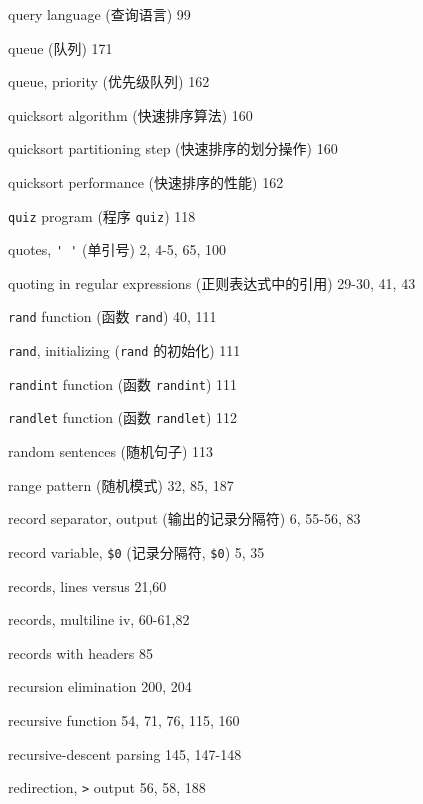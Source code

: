 \begin{multicols}{3}
\hangindent=3pc  query language (查询语言) 99

\hangindent=3pc  queue (队列) 171

\hangindent=3pc  queue, priority (优先级队列) 162

\hangindent=3pc  quicksort algorithm (快速排序算法) 160

\hangindent=3pc  quicksort partitioning step
(快速排序的划分操作) 160

\hangindent=3pc  quicksort performance (快速排序的性能) 162

\hangindent=3pc  \verb'quiz' program (程序 \verb'quiz') 118

\hangindent=3pc  quotes, \verb"' '" (单引号) 2, 4-5, 65, 100

\hangindent=3pc  quoting in regular expressions
(正则表达式中的引用) 29-30, 41, 43

\hangindent=3pc  \verb'rand' function (函数 \verb'rand') 40, 111

\hangindent=3pc  \verb'rand', initializing (\verb'rand'
的初始化) 111

\hangindent=3pc  \verb'randint' function (函数 \verb'randint') 111

\hangindent=3pc  \verb'randlet' function (函数 \verb'randlet') 112

\hangindent=3pc  random sentences (随机句子) 113

\hangindent=3pc  range pattern (随机模式) 32, 85, 187

\hangindent=3pc  record separator, output (输出的记录分隔符)
6, 55-56, 83

\hangindent=3pc  record variable, \verb'$0' (记录分隔符,
\verb'$0') 5, 35

\hangindent=3pc  records, lines versus 21,60

\hangindent=3pc  records, multiline iv, 60-61,82

\hangindent=3pc  records with headers 85

\hangindent=3pc  recursion elimination 200, 204

\hangindent=3pc  recursive function 54, 71, 76, 115, 160

\hangindent=3pc  recursive-descent parsing 145, 147-148

\hangindent=3pc  redirection, \verb'>' output 56, 58, 188


\end{multicols}
